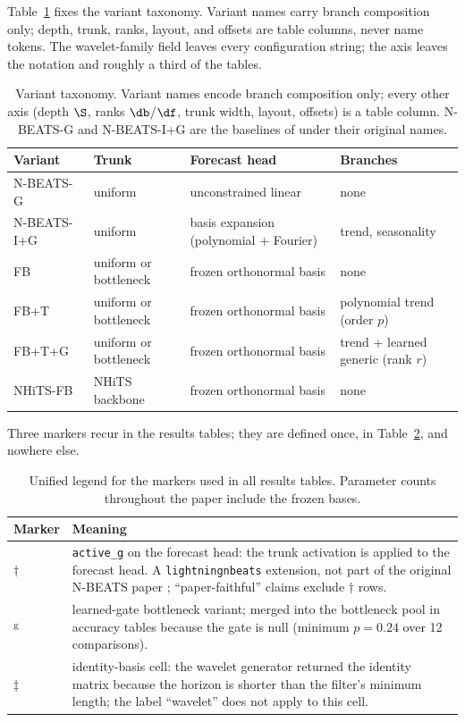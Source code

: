 Table~\ref{tab:taxonomy} fixes the variant taxonomy. Variant names carry branch composition
only; depth, trunk, ranks, layout, and offsets are table columns, never name tokens. The
wavelet-family field leaves every configuration string; the axis leaves the notation and roughly
a third of the tables.

\begin{table}[t]
\centering
\small
\caption{Variant taxonomy. Variant names encode branch composition only; every other axis
(depth $\S$, ranks $\db$/$\df$, trunk width, layout, offsets) is a table column. N-BEATS-G and
N-BEATS-I+G are the baselines of \citet{oreshkin2020nbeats} under their original names.}
\label{tab:taxonomy}
\begin{tabular}{@{}llll@{}}
\toprule
Variant & Trunk & Forecast head & Branches \\
\midrule
N-BEATS-G   & uniform             & unconstrained linear                        & none \\
N-BEATS-I+G & uniform             & basis expansion (polynomial + Fourier)      & trend, seasonality \\
FB          & uniform or bottleneck & frozen orthonormal basis                    & none \\
FB+T        & uniform or bottleneck & frozen orthonormal basis                    & polynomial trend (order $p$) \\
FB+T+G      & uniform or bottleneck & frozen orthonormal basis                    & trend + learned generic (rank $r$) \\
NHiTS-FB    & NHiTS backbone \citep{challu2023nhits} & frozen orthonormal basis & none \\
\bottomrule
\end{tabular}
\end{table}

Three markers recur in the results tables; they are defined once, in
Table~\ref{tab:legend}, and nowhere else.

\begin{table}[t]
\centering
\small
\caption{Unified legend for the markers used in all results tables. Parameter counts throughout
the paper include the frozen bases.}
\label{tab:legend}
\begin{tabular}{@{}lp{}@{}}
\toprule
Marker & Meaning \\
\midrule
$\dagger$ & \texttt{active\_g} on the forecast head: the trunk activation is applied to the
forecast head. A \texttt{lightningnbeats} extension, not part of the original N-BEATS paper
\citep{oreshkin2020nbeats}; ``paper-faithful'' claims exclude $\dagger$ rows. \\
\textsuperscript{g} & learned-gate bottleneck variant; merged into the bottleneck pool in
accuracy tables because the gate is null (minimum $p = 0.24$ over 12 comparisons). \\
$\ddagger$ & identity-basis cell: the wavelet generator returned the identity matrix because the
horizon is shorter than the filter's minimum length; the label ``wavelet'' does not apply to
this cell. \\
\bottomrule
\end{tabular}
\end{table}

